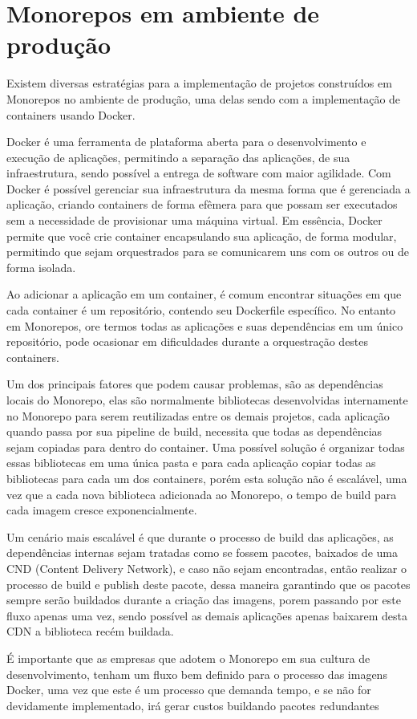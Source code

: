 \section{Monorepos em ambiente de produção}

Existem diversas estratégias para a implementação de projetos construídos em Monorepos no ambiente de produção, uma delas sendo com a implementação de containers usando Docker. 

Docker é uma ferramenta de plataforma aberta para o desenvolvimento e execução de aplicações, permitindo a separação das aplicações, de sua infraestrutura, sendo possível a entrega de software com maior agilidade. Com Docker é possível gerenciar sua infraestrutura da mesma forma que é gerenciada a aplicação, criando containers de forma efêmera para que possam ser executados sem a necessidade de provisionar uma máquina virtual. Em essência, Docker permite que você crie container encapsulando sua aplicação, de forma modular, permitindo que sejam orquestrados para se comunicarem uns com os outros ou de forma isolada. 

Ao adicionar a aplicação em um container, é comum encontrar situações em que cada container é um repositório, contendo seu Dockerfile específico. No entanto em Monorepos, ore termos todas as aplicações e suas dependências em um único repositório, pode ocasionar em dificuldades durante a orquestração destes containers. 

Um dos principais fatores que podem causar problemas, são as dependências locais do Monorepo, elas são normalmente bibliotecas desenvolvidas internamente no Monorepo para serem reutilizadas entre os demais projetos, cada aplicação quando passa por sua pipeline de build, necessita que todas as dependências sejam copiadas para dentro do container. Uma possível solução é organizar todas essas bibliotecas em uma única pasta e para cada aplicação copiar todas as bibliotecas para cada um dos containers, porém esta solução não é escalável, uma vez que a cada nova biblioteca adicionada ao Monorepo, o tempo de build para cada imagem cresce exponencialmente. 

Um cenário mais escalável é que durante o processo de build das aplicações, as dependências internas sejam tratadas como se fossem pacotes, baixados de uma CND (Content Delivery Network), e caso não sejam encontradas, então realizar o processo de build e publish deste pacote, dessa maneira garantindo que os pacotes sempre serão buildados durante a criação das imagens, porem passando por este fluxo apenas uma vez, sendo possível as demais aplicações apenas baixarem desta CDN a biblioteca recém buildada. 

É importante que as empresas que adotem o Monorepo em sua cultura de desenvolvimento, tenham um fluxo bem definido para o processo das imagens Docker, uma vez que este é um processo que demanda tempo, e se não for devidamente implementado, irá gerar custos buildando pacotes redundantes 